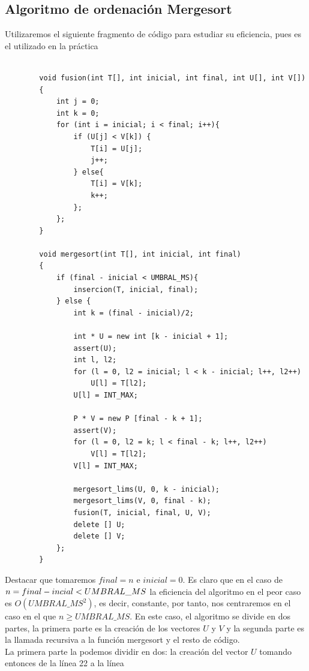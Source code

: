 \documentclass[11pt]{article}
\begin{document}
        \subsection*{Algoritmo de ordenación Mergesort}
        Utilizaremos el siguiente fragmento de código para estudiar su eficiencia, pues es el utilizado en la práctica
        \begin{lstlisting}
  
        void fusion(int T[], int inicial, int final, int U[], int V[])
        {
            int j = 0;
            int k = 0;
            for (int i = inicial; i < final; i++){
                if (U[j] < V[k]) {
                    T[i] = U[j];
                    j++;
                } else{
                    T[i] = V[k];
                    k++;
                };
            };
        }

        void mergesort(int T[], int inicial, int final)
        {
            if (final - inicial < UMBRAL_MS){
                insercion(T, inicial, final);
            } else {
                int k = (final - inicial)/2;

                int * U = new int [k - inicial + 1];
                assert(U);
                int l, l2;
                for (l = 0, l2 = inicial; l < k - inicial; l++, l2++)
                    U[l] = T[l2];
                U[l] = INT_MAX;

                P * V = new P [final - k + 1];
                assert(V);
                for (l = 0, l2 = k; l < final - k; l++, l2++)
                    V[l] = T[l2];
                V[l] = INT_MAX;

                mergesort_lims(U, 0, k - inicial);
                mergesort_lims(V, 0, final - k);
                fusion(T, inicial, final, U, V);
                delete [] U;
                delete [] V;
            };
        }
        \end{lstlisting}
        Destacar que tomaremos $final=n$ e $inicial=0$. Es claro que en el caso de $n=final-incial<\nobreak UMBRAL\_MS$ 
        la eficiencia del algoritmo en el peor caso es $O(UMBRAL\_MS^2)$, es decir, constante, por tanto, nos centraremos en el caso en el que $n\geq UMBRAL\_MS$.
        En este caso, el algoritmo se divide en dos partes, la primera parte es la creación de los vectores $U$ y $V$ y la segunda parte es la
        llamada recursiva a la función mergesort y el resto de código. \\
        La primera parte la podemos dividir en dos: la creación del vector $U$ tomando entonces de la línea 22 a la línea
\end{document}
